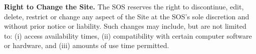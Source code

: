\textbf{Right to Change the Site.}
The SOS reserves the right to discontinue, edit, delete, restrict or change any
aspect of the Site at the SOS's sole discretion and without prior notice or
liability. Such changes may include, but are not limited to: (i) access
availability times, (ii) compatibility with certain computer software or
hardware, and (iii) amounts of use time permitted.